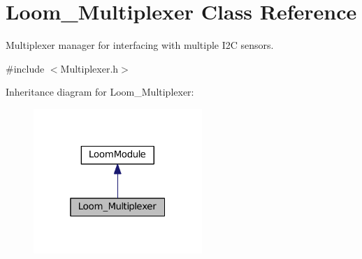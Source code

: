 \hypertarget{class_loom___multiplexer}{}\section{Loom\+\_\+\+Multiplexer Class Reference}
\label{class_loom___multiplexer}


Multiplexer manager for interfacing with multiple I2C sensors.  




{\ttfamily \#include $<$Multiplexer.\+h$>$}



Inheritance diagram for Loom\+\_\+\+Multiplexer\+:\nopagebreak
\begin{figure}[H]
\begin{center}
\leavevmode
\includegraphics[width=181pt]{class_loom___multiplexer__inherit__graph}
\end{center}
\end{figure}
